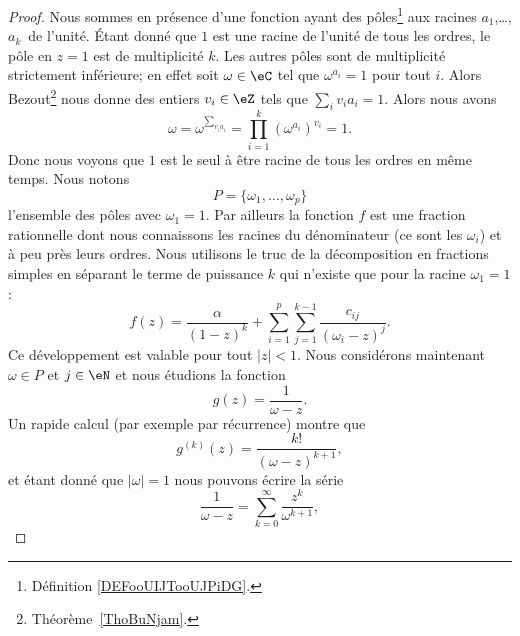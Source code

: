 \begin{proof}
    Nous sommes en présence d'une fonction ayant des pôles\footnote{Définition \ref{DEFooUIJTooUJPiDG}.} aux racines \( a_1\),\ldots, \( a_k\)\ieme\ de l'unité. Étant donné que \( 1\) est une racine de l'unité de tous les ordres, le pôle en \( z=1\) est de multiplicité \( k\). Les autres pôles sont de multiplicité strictement inférieure; en effet soit \( \omega\in \eC\) tel que \( \omega^{a_i}=1\) pour tout \( i\). Alors Bezout\footnote{Théorème~\ref{ThoBuNjam}.} nous donne des entiers \( v_i\in \eZ\) tels que \( \sum_iv_ia_i=1\). Alors nous avons
    \begin{equation}
        \omega=\omega^{\sum_{v_ia_i}}=\prod_{i=1}^k(\omega^{a_i})^{v_i}=1.
    \end{equation}
    Donc nous voyons que \( 1\) est le seul à être racine de tous les ordres en même temps. Nous notons
    \begin{equation}
        P=\{ \omega_1,\ldots, \omega_p \}
    \end{equation}
    l'ensemble des pôles avec \( \omega_1=1\). Par ailleurs la fonction \( f\) est une fraction rationnelle dont nous connaissons les racines du dénominateur (ce sont les \( \omega_i\)) et à peu près leurs ordres. Nous utilisons le truc de la décomposition en fractions simples
    en séparant le terme de puissance \( k\) qui n'existe que pour la racine \( \omega_1=1\) :
    \begin{equation}    \label{EqDLTJaYr}
        f(z)=\frac{ \alpha }{ (1-z)^k }+\sum_{i=1}^p\sum_{j=1}^{k-1}\frac{ c_{ij} }{ (\omega_i-z)^j }.
    \end{equation}
    Ce développement est valable pour tout \( | z |<1\). Nous considérons maintenant \( \omega\in P\) et \( j\in \eN\) et nous étudions la fonction
    \begin{equation}
        g(z)=\frac{1}{ \omega-z }.
    \end{equation}
    Un rapide calcul (par exemple par récurrence) montre que
    \begin{equation}    \label{EqEJLDIFJ}
        g^{(k)}(z)=\frac{ k! }{ (\omega-z)^{k+1} },
    \end{equation}
    et étant donné que \( | \omega |=1\) nous pouvons écrire la série
    \begin{equation}
        \frac{1}{ \omega-z }=\sum_{k=0}^{\infty}\frac{ z^k }{ \omega^{k+1} },

\end{equation}
\end{proof}

